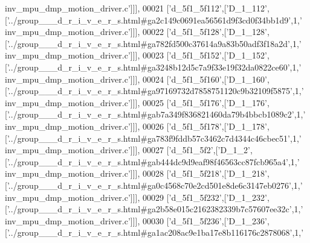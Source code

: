 \begin{DoxyCode}
{      inv\_mpu\_dmp\_motion\_driver.c'}]]],
00021   [\textcolor{stringliteral}{'d\_5f1\_5f112'},[\textcolor{stringliteral}{'D\_1\_112'},[\textcolor{stringliteral}{'../group\_\_\_d\_r\_i\_v\_e\_r\_s.html#ga2c149c0691ea56561d9f3cd0f34bb1d9'},1,\textcolor{stringliteral}{'
      inv\_mpu\_dmp\_motion\_driver.c'}]]],
00022   [\textcolor{stringliteral}{'d\_5f1\_5f128'},[\textcolor{stringliteral}{'D\_1\_128'},[\textcolor{stringliteral}{'../group\_\_\_d\_r\_i\_v\_e\_r\_s.html#ga782fd500c37614a9a83b50adf3f18a2d'},1,\textcolor{stringliteral}{'
      inv\_mpu\_dmp\_motion\_driver.c'}]]],
00023   [\textcolor{stringliteral}{'d\_5f1\_5f152'},[\textcolor{stringliteral}{'D\_1\_152'},[\textcolor{stringliteral}{'../group\_\_\_d\_r\_i\_v\_e\_r\_s.html#ga3248b12d5c7a9f33e19f32da0822ce60'},1,\textcolor{stringliteral}{'
      inv\_mpu\_dmp\_motion\_driver.c'}]]],
00024   [\textcolor{stringliteral}{'d\_5f1\_5f160'},[\textcolor{stringliteral}{'D\_1\_160'},[\textcolor{stringliteral}{'../group\_\_\_d\_r\_i\_v\_e\_r\_s.html#ga97169732d7858751120c9b32109f5875'},1,\textcolor{stringliteral}{'
      inv\_mpu\_dmp\_motion\_driver.c'}]]],
00025   [\textcolor{stringliteral}{'d\_5f1\_5f176'},[\textcolor{stringliteral}{'D\_1\_176'},[\textcolor{stringliteral}{'../group\_\_\_d\_r\_i\_v\_e\_r\_s.html#gab7a349f836821460da79b4bbcb1089c2'},1,\textcolor{stringliteral}{'
      inv\_mpu\_dmp\_motion\_driver.c'}]]],
00026   [\textcolor{stringliteral}{'d\_5f1\_5f178'},[\textcolor{stringliteral}{'D\_1\_178'},[\textcolor{stringliteral}{'../group\_\_\_d\_r\_i\_v\_e\_r\_s.html#ga783f9fddb57c3462c7d4344c46cbec51'},1,\textcolor{stringliteral}{'
      inv\_mpu\_dmp\_motion\_driver.c'}]]],
00027   [\textcolor{stringliteral}{'d\_5f1\_5f2'},[\textcolor{stringliteral}{'D\_1\_2'},[\textcolor{stringliteral}{'../group\_\_\_d\_r\_i\_v\_e\_r\_s.html#gab444dc9d9eaf98f46563cc87fcb965a4'},1,\textcolor{stringliteral}{'
      inv\_mpu\_dmp\_motion\_driver.c'}]]],
00028   [\textcolor{stringliteral}{'d\_5f1\_5f218'},[\textcolor{stringliteral}{'D\_1\_218'},[\textcolor{stringliteral}{'../group\_\_\_d\_r\_i\_v\_e\_r\_s.html#ga0c4568c70e2cd501e8de6c3147eb0276'},1,\textcolor{stringliteral}{'
      inv\_mpu\_dmp\_motion\_driver.c'}]]],
00029   [\textcolor{stringliteral}{'d\_5f1\_5f232'},[\textcolor{stringliteral}{'D\_1\_232'},[\textcolor{stringliteral}{'../group\_\_\_d\_r\_i\_v\_e\_r\_s.html#ga2b58e015c2162382339b7c57607ee32c'},1,\textcolor{stringliteral}{'
      inv\_mpu\_dmp\_motion\_driver.c'}]]],
00030   [\textcolor{stringliteral}{'d\_5f1\_5f236'},[\textcolor{stringliteral}{'D\_1\_236'},[\textcolor{stringliteral}{'../group\_\_\_d\_r\_i\_v\_e\_r\_s.html#ga1ac208ac9e1ba17e8b116176c2878068'},1,\textcolor{stringliteral}{'
}
\end{DoxyCode}
